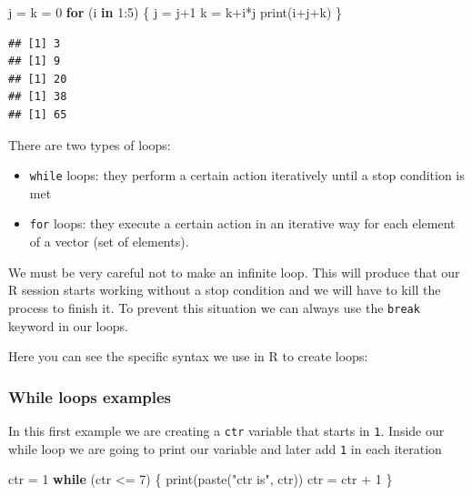 \documentclass[
]{book}
\newenvironment{Shaded}{\begin{snugshade}}{\end{snugshade}}
\newcommand{\ControlFlowTok}[1]{\textcolor[rgb]{0.13,0.29,0.53}{\textbf{#1}}}
\newcommand{\DecValTok}[1]{\textcolor[rgb]{0.00,0.00,0.81}{#1}}
\newcommand{\FunctionTok}[1]{\textcolor[rgb]{0.00,0.00,0.00}{#1}}
\newcommand{\NormalTok}[1]{#1}
\newcommand{\OtherTok}[1]{\textcolor[rgb]{0.56,0.35,0.01}{#1}}
\newcommand{\SpecialCharTok}[1]{\textcolor[rgb]{0.00,0.00,0.00}{#1}}
\newcommand{\StringTok}[1]{\textcolor[rgb]{0.31,0.60,0.02}{#1}}
\begin{document}
\begin{Shaded}
\begin{Highlighting}[]
\NormalTok{j }\OtherTok{=}\NormalTok{ k }\OtherTok{=} \DecValTok{0}
\ControlFlowTok{for}\NormalTok{ (i }\ControlFlowTok{in} \DecValTok{1}\SpecialCharTok{:}\DecValTok{5}\NormalTok{) \{}
\NormalTok{  j }\OtherTok{=}\NormalTok{ j}\SpecialCharTok{+}\DecValTok{1}
\NormalTok{  k }\OtherTok{=}\NormalTok{ k}\SpecialCharTok{+}\NormalTok{i}\SpecialCharTok{*}\NormalTok{j}
  \FunctionTok{print}\NormalTok{(i}\SpecialCharTok{+}\NormalTok{j}\SpecialCharTok{+}\NormalTok{k)}
\NormalTok{  \}}
\end{Highlighting}
\end{Shaded}

\begin{verbatim}
## [1] 3
## [1] 9
## [1] 20
## [1] 38
## [1] 65
\end{verbatim}

There are two types of loops:

\begin{itemize}
\item
  \texttt{while} loops: they perform a certain action iteratively until a stop condition is met
\item
  \texttt{for} loops: they execute a certain action in an iterative way for each element of a vector (set of elements).
\end{itemize}

We must be very careful not to make an infinite loop. This will produce that our R session starts working without a stop condition and we will have to kill the process to finish it. To prevent this situation we can always use the \texttt{break} keyword in our loops.

Here you can see the specific syntax we use in R to create loops:

\hypertarget{while-loops-examples}{%
\subsubsection{While loops examples}\label{while-loops-examples}}

In this first example we are creating a \texttt{ctr} variable that starts in \texttt{1}. Inside our while loop we are going to print our variable and later add \texttt{1} in each iteration

\begin{Shaded}
\begin{Highlighting}[]
\NormalTok{ctr }\OtherTok{=} \DecValTok{1}
\ControlFlowTok{while}\NormalTok{ (ctr }\SpecialCharTok{\textless{}=} \DecValTok{7}\NormalTok{) \{}
  \FunctionTok{print}\NormalTok{(}\FunctionTok{paste}\NormalTok{(}\StringTok{"ctr is"}\NormalTok{, ctr))}
\NormalTok{  ctr }\OtherTok{=}\NormalTok{ ctr }\SpecialCharTok{+} \DecValTok{1}
\NormalTok{\}}
\end{Highlighting}
\end{Shaded}
\end{document}
